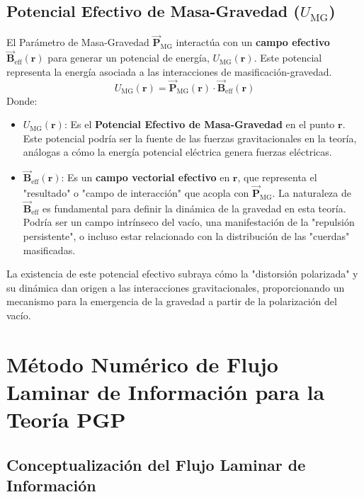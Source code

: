 \documentclass{book}
\newcommand{\bvec}[1]{\vec{\mathbf{#1}}}
\begin{document}
\subsection*{Potencial Efectivo de Masa-Gravedad ($U_{\text{MG}}$)}
El Parámetro de Masa-Gravedad $\bvec{P}_{\text{MG}}$ interactúa con un \textbf{campo efectivo $\bvec{B}_{\text{eff}}(\mathbf{r})$} para generar un potencial de energía, $U_{\text{MG}}(\mathbf{r})$. Este potencial representa la energía asociada a las interacciones de masificación-gravedad.
\begin{equation}
    U_{\text{MG}}(\mathbf{r}) = \bvec{P}_{\text{MG}}(\mathbf{r}) \cdot \bvec{B}_{\text{eff}}(\mathbf{r})
    \label{eq:umg_definition}
\end{equation}
Donde:
\begin{itemize}
    \item $U_{\text{MG}}(\mathbf{r})$: Es el \textbf{Potencial Efectivo de Masa-Gravedad} en el punto $\mathbf{r}$. Este potencial podría ser la fuente de las fuerzas gravitacionales en la teoría, análogas a cómo la energía potencial eléctrica genera fuerzas eléctricas.
    \item $\bvec{B}_{\text{eff}}(\mathbf{r})$: Es un \textbf{campo vectorial efectivo} en $\mathbf{r}$, que representa el "resultado" o "campo de interacción" que acopla con $\bvec{P}_{\text{MG}}$. La naturaleza de $\bvec{B}_{\text{eff}}$ es fundamental para definir la dinámica de la gravedad en esta teoría. Podría ser un campo intrínseco del vacío, una manifestación de la "repulsión persistente", o incluso estar relacionado con la distribución de las "cuerdas" masificadas.
\end{itemize}
La existencia de este potencial efectivo subraya cómo la "distorsión polarizada" y su dinámica dan origen a las interacciones gravitacionales, proporcionando un mecanismo para la emergencia de la gravedad a partir de la polarización del vacío.

\section{Método Numérico de Flujo Laminar de Información para la Teoría PGP}
\subsection*{Conceptualización del Flujo Laminar de Información}
\end{document}
